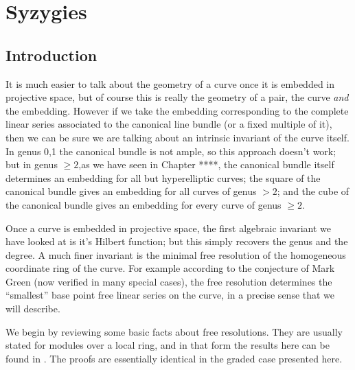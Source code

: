 

\chapter{Syzygies}
\label{SyzygiesChapter}

\section{Introduction} 
%
%

It is much easier to talk about the geometry of a curve once it is embedded in projective space, but of course this is really the geometry of a pair, the curve \emph{and} the embedding. However if we take the embedding corresponding to the complete linear series associated to the canonical line bundle (or a fixed multiple of it), then we can be sure we are talking about an intrinsic invariant of the curve itself. In genus 0,1 the canonical bundle is not ample, so this approach doesn't work; but in genus $\geq 2$,as we have seen in Chapter ****, the canonical bundle itself determines an embedding for all but hyperelliptic curves; the square of the canonical bundle gives an embedding for all  curves of genus $>2$; and the cube of the canonical bundle gives an embedding for every curve of genus $\geq 2$. 

Once a curve is embedded in projective space, the first algebraic invariant we have looked at is it's Hilbert function; but this simply recovers the genus and the degree. A much finer invariant is the minimal free resolution of the homogeneous coordinate ring of the curve. For example according to the conjecture of Mark Green (now verified in many special cases), the free resolution determines the ``smallest'' base point free linear series on the curve, in a precise sense that we will describe.

We begin by reviewing some basic facts about free resolutions. They are usually stated for
modules over a local ring, and in that form the results here can be found in \cite[Ch ?]{E}. The proofs are essentially identical in the graded case presented here.

